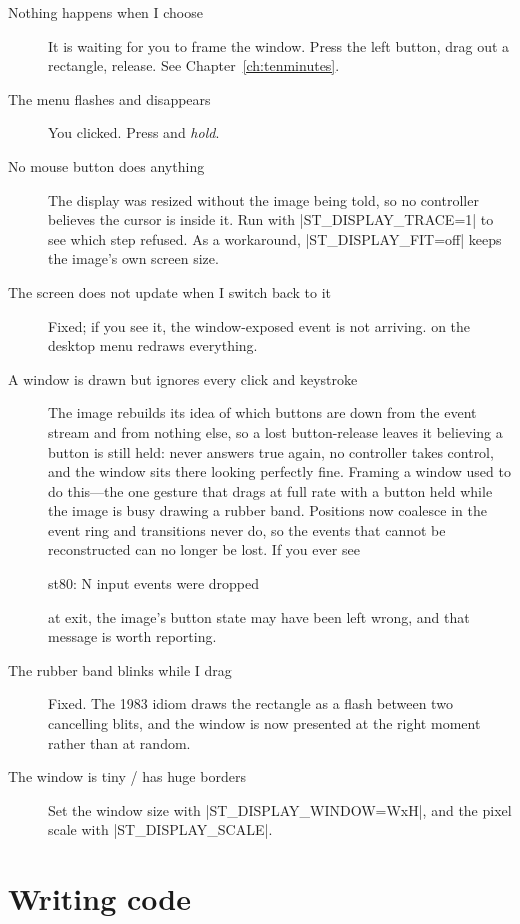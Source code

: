 \begin{description}
\item[Nothing happens when I choose ] It is waiting for you to
  frame the window. Press the left button, drag out a rectangle, release. See
  Chapter~\ref{ch:tenminutes}.
\item[The menu flashes and disappears] You clicked. Press and \emph{hold}.
\item[No mouse button does anything] The display was resized without the image
  being told, so no controller believes the cursor is inside it. Run with
  \ct|ST_DISPLAY_TRACE=1| to see which step refused. As a workaround,
  \ct|ST_DISPLAY_FIT=off| keeps the image's own screen size.
\item[The screen does not update when I switch back to it] Fixed; if you see
  it, the window-exposed event is not arriving.  on the
  desktop menu redraws everything.
\item[A window is drawn but ignores every click and keystroke] The image
  rebuilds its idea of which buttons are down from the event stream and from
  nothing else, so a lost button-release leaves it believing a button is
  still held:  never answers true again, no
  controller takes control, and the window sits there looking perfectly
  fine. Framing a window used to do this---the one gesture that drags at
  full rate with a button held while the image is busy drawing a rubber
  band. Positions now coalesce in the event ring and transitions never do,
  so the events that cannot be reconstructed can no longer be lost. If you
  ever see
\begin{plain}
st80: N input events were dropped
\end{plain}
  at exit, the image's button state may have been left wrong, and that
  message is worth reporting.
\item[The rubber band blinks while I drag] Fixed. The 1983 idiom draws the
  rectangle as a flash between two cancelling blits, and the window is now
  presented at the right moment rather than at random.
\item[The window is tiny / has huge borders] Set the window size with
  \ct|ST_DISPLAY_WINDOW=WxH|, and the pixel scale with
  \ct|ST_DISPLAY_SCALE|.
\end{description}

\section{Writing code}

